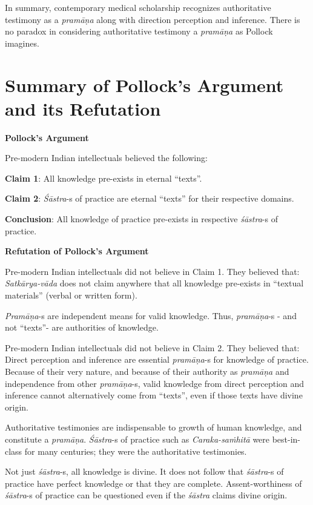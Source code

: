In summary, contemporary medical scholarship recognizes authoritative testimony as a {\sl pramāṇa} along with direction perception and inference. There is no paradox in considering authoritative testimony a {\sl pramāṇa} as Pollock imagines.\\[-17pt]

\section*{Summary of Pollock's Argument and its Refutation}

{\bf Pollock's Argument}

Pre-modern Indian intellectuals believed the following:

{\bf Claim 1}: All knowledge pre-exists in eternal ``texts''.  

{\bf Claim 2}: {\sl Śāstra}-s of practice are eternal ``texts'' for their respective domains.

{\bf Conclusion}:  All knowledge of practice pre-exists in respective {\sl śāstra}-s of practice. 

\newpage

{\bf Refutation of Pollock's Argument}

Pre-modern Indian intellectuals did not believe in Claim 1.  They believed that:
\textsl{Satkārya-vāda} does not claim anywhere that all knowledge pre-exists in ``textual materials'' (verbal or written form).

\textsl{Pramāņa}-s are independent means for valid knowledge. Thus, {\sl pramāṇa}-s - and not ``texts''- are authorities of knowledge.

Pre-modern Indian intellectuals did not believe in Claim 2.  They believed that:
Direct perception and inference are essential \hbox{{\sl pramāṇa}-s} for knowledge of practice.  Because of their very nature, and because of their authority as {\sl pramāṇa} and independence from other {\sl pramāṇa}-s, valid knowledge from direct perception and inference cannot alternatively come from ``texts'', even if those texts have divine origin.

Authoritative testimonies are indispensable to growth of human knowledge, and constitute a {\sl pramāṇa}.  {\sl Śāstra}-s of practice such as {\sl Caraka-saṁhitā} were best-in-class for many centuries; they were the authoritative testimonies.

Not just {\sl śāstra}-s, all knowledge is divine. It does not follow that {\sl śāstra}-s of practice have perfect knowledge or that they are complete.
Assent-worthiness of {\sl śāstra}-s of practice can be questioned even if the {\sl śāstra} claims divine origin.

